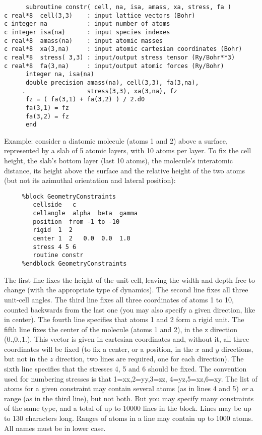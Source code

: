 \documentclass[11pt]{article}
\begin{document}
\begin{description}
\begin{itemize}
\begin{verbatim}
      subroutine constr( cell, na, isa, amass, xa, stress, fa )
c real*8  cell(3,3)    : input lattice vectors (Bohr)
c integer na           : input number of atoms
c integer isa(na)      : input species indexes
c real*8  amass(na)    : input atomic masses
c real*8  xa(3,na)     : input atomic cartesian coordinates (Bohr)
c real*8  stress( 3,3) : input/output stress tensor (Ry/Bohr**3)
c real*8  fa(3,na)     : input/output atomic forces (Ry/Bohr)
      integer na, isa(na)
      double precision amass(na), cell(3,3), fa(3,na),
     .                 stress(3,3), xa(3,na), fz
      fz = ( fa(3,1) + fa(3,2) ) / 2.d0
      fa(3,1) = fz
      fa(3,2) = fz
      end
\end{verbatim}

\end{itemize}

Example: consider a diatomic molecule (atoms 1 and 2) above a surface, 
represented by a slab of 5 atomic layers, with 10 atoms per layer.
To fix the cell height, the slab's bottom layer (last 10 atoms),
the molecule's interatomic distance, its height above the surface and
the relative height of the two atoms
(but not its azimuthal orientation and lateral position):

\begin{verbatim}
     %block GeometryConstraints
        cellside   c 
        cellangle  alpha  beta  gamma
        position  from -1 to -10
        rigid  1  2
        center 1  2   0.0  0.0  1.0
        stress 4 5 6
        routine constr
     %endblock GeometryConstraints
\end{verbatim}

The first line fixes the height of the unit cell, leaving the width
and depth free to change (with the appropriate type of dynamics).  The
second line fixes all three unit-cell angles.  The third line fixes
all three coordinates of atoms 1 to 10, counted backwards from the
last one (you may also specify a given direction, like in center).
The fourth line specifies that atoms 1 and 2 form a rigid unit.  The
fifth line fixes the center of the molecule (atoms 1 and 2), in the z
direction (0.,0.,1.). This vector is given in cartesian coordinates
and, without it, all three coordinates will be fixed (to fix a center,
or a position, in the $x$ and $y$ directions, but not in the $z$
direction, two lines are required, one for each direction).  The sixth
line specifies that the stresses 4, 5 and 6 should be fixed.  The
convention used for numbering stresses is that 1=xx,2=yy,3=zz,
4=yz,5=xz,6=xy.  The list of atoms for a given constraint may contain
several atoms (as in lines 4 and 5) {\it or} a range (as in the third
line), but not both. But you may specify many constraints of the same
type, and a total of up to 10000 lines in the block.  Lines may be up
to 130 characters long. Ranges of atoms in a line may contain up to
1000 atoms. All names must be in lower case.


\end{description}
\end{document}
